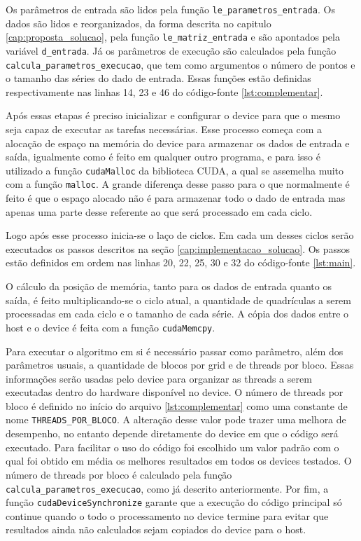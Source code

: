 Os parâmetros de entrada são lidos pela função \texttt{le\_parametros\_entrada}. Os dados são lidos e reorganizados, da forma descrita no capitulo \ref{cap:proposta_solucao}, pela função \texttt{le\_matriz\_entrada} e são apontados pela variável \texttt{d\_entrada}. Já os parâmetros de execução são calculados pela função \texttt{calcula\_parametros\_execucao}, que tem como argumentos o número de pontos e o tamanho das séries do dado de entrada. Essas funções estão definidas respectivamente nas linhas 14, 23 e 46 do código-fonte \ref{lst:complementar}.

Após essas etapas é preciso inicializar e configurar o device para que o mesmo seja capaz de executar as tarefas necessárias. Esse processo começa com a alocação de espaço na memória do device para armazenar os dados de entrada e saída, igualmente como é feito em qualquer outro programa, e para isso é utilizado a função \texttt{cudaMalloc} da biblioteca CUDA, a qual se assemelha muito com a função \texttt{malloc}. A grande diferença desse passo para o que normalmente é feito é que o espaço alocado não é para armazenar todo o dado de entrada mas apenas uma parte desse referente ao que será processado em cada ciclo.

Logo após esse processo inicia-se o laço de ciclos. Em cada um desses ciclos serão executados os passos descritos na seção \ref{cap:implementacao_solucao}. Os passos estão definidos em ordem nas linhas 20, 22, 25, 30 e 32 do código-fonte \ref{lst:main}.


\pagebreak

O cálculo da posição de memória, tanto para os dados de entrada quanto os saída, é feito multiplicando-se o ciclo atual, a quantidade de quadrículas a serem processadas em cada ciclo e o tamanho de cada série. A cópia dos dados entre o host e o device é feita com a função \texttt{cudaMemcpy}.

Para executar o algoritmo em si é necessário passar como parâmetro, além dos parâmetros usuais, a quantidade de blocos por grid e de threads por bloco. Essas informações serão usadas pelo device para organizar as threads a serem executadas dentro do hardware disponível no device. O número de threads por bloco é definido no início do arquivo \ref{lst:complementar} como uma constante de nome \texttt{THREADS\_POR\_BLOCO}. A alteração desse valor pode trazer uma melhora de desempenho, no entanto depende diretamente do device em que o código será executado. Para facilitar o uso do código foi escolhido um valor padrão com o qual foi obtido em média os melhores resultados em todos os devices testados. O número de threads por bloco é calculado pela função \texttt{calcula\_parametros\_execucao}, como já descrito anteriormente. Por fim, a função \texttt{cudaDeviceSynchronize} garante que a execução do código principal só continue quando o todo o processamento no device termine para evitar que resultados ainda não calculados sejam copiados do device para o host.

